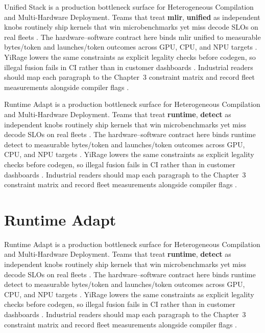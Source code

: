 Unified Stack is a production bottleneck surface for Heterogeneous Compilation and Multi-Hardware Deployment. Teams that treat \textbf{mlir}, \textbf{unified} as independent knobs routinely ship kernels that win microbenchmarks yet miss decode SLOs on real fleets \citep{patel2025llminference,nvidia2022hopper}. The hardware--software contract here binds mlir unified to measurable bytes/token and launches/token outcomes across GPU, CPU, and NPU targets \citep{taxbreak2026,semianalysis2024tma}. YiRage lowers the same constraints as explicit legality checks before codegen, so illegal fusion fails in CI rather than in customer dashboards \citep{memoryfloor2026,amd2024xdna}. Industrial readers should map each paragraph to the Chapter~3 constraint matrix and record fleet measurements alongside compiler flags \citep{nvidia2022hopper,amd2024aie}.

Runtime Adapt is a production bottleneck surface for Heterogeneous Compilation and Multi-Hardware Deployment. Teams that treat \textbf{runtime}, \textbf{detect} as independent knobs routinely ship kernels that win microbenchmarks yet miss decode SLOs on real fleets \citep{taxbreak2026,semianalysis2024tma}. The hardware--software contract here binds runtime detect to measurable bytes/token and launches/token outcomes across GPU, CPU, and NPU targets \citep{memoryfloor2026,amd2024xdna}. YiRage lowers the same constraints as explicit legality checks before codegen, so illegal fusion fails in CI rather than in customer dashboards \citep{nvidia2022hopper,amd2024aie}. Industrial readers should map each paragraph to the Chapter~3 constraint matrix and record fleet measurements alongside compiler flags \citep{semianalysis2024tma,dlbook}.

\section{Runtime Adapt}
\label{sec:runtime_adapt}

Runtime Adapt is a production bottleneck surface for Heterogeneous Compilation and Multi-Hardware Deployment. Teams that treat \textbf{runtime}, \textbf{detect} as independent knobs routinely ship kernels that win microbenchmarks yet miss decode SLOs on real fleets \citep{memoryfloor2026,amd2024xdna}. The hardware--software contract here binds runtime detect to measurable bytes/token and launches/token outcomes across GPU, CPU, and NPU targets \citep{nvidia2022hopper,amd2024aie}. YiRage lowers the same constraints as explicit legality checks before codegen, so illegal fusion fails in CI rather than in customer dashboards \citep{semianalysis2024tma,dlbook}. Industrial readers should map each paragraph to the Chapter~3 constraint matrix and record fleet measurements alongside compiler flags \citep{amd2024xdna,dao2022flashattention}.


